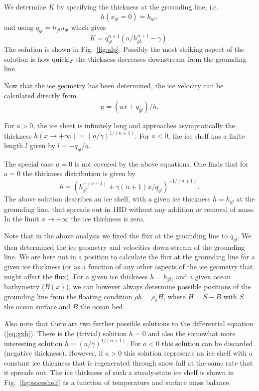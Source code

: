 \documentclass[10pt,a4paper]{book}
\begin{document}
We determine $K$ by specifying the
thickness at the grounding line, i.e.\
\[
h(x_{gl}=0)=h_{gl},
\]
and using $q_{gl}=h_{gl} u_{gl}$ which gives 
\[
K=q_{gl}^{n + 1}(a/h_{gl}^{n + 1}-\gamma).
\]
The solution is shown in Fig.~\ref{fig:alp}. Possibly the most
striking aspect of the solution is how quickly the thickness decreases
downstream from the grounding line.

Now that the ice geometry has been determined, the ice velocity can be
calculated directly from
\[
u=(a x+ q_{gl})/h.
\]


For $a>0$, the ice sheet is infinitely long and approaches
asymptotically the thickness $h(x\to +
\infty)=(a/\gamma)^{1/(n+1)}$. For $a<0$, the ice shelf has a finite
length $l$ given by $l=-q_{gl}/a$.

The special case $a=0$ is not covered by the above equations. One
finds that for $a=0$ the thickness distribution is given by
\begin{equation}
h=(h_{gl}^{-(n+1)}+\gamma (n+1) x/q_{gl})^{-1/(n+1)}.
\end{equation}
The above solution describes an ice shelf, with a given ice thickness
$h=h_{gl}$ at the grounding line, that spreads out in 1HD without any
addition or removal of mass. In the limit $x
\to +\infty$ the ice thickness is zero.



Note that in the above analysis we fixed the flux at the grounding
line to $q_{gl}$. We then determined the ice geometry and velocities
down-stream of the grounding line. We are here not in a position to
calculate the flux at the grounding line for a given ice thickness (or
as a function of any other aspects of the ice geometry that might
affect the flux). For a given ice thickness $h=h_{gl}$, and a given
ocean bathymetry ($B(x)$), we can however always determine possible
positions of the grounding line from the floating condition $\rho h =
\rho_o H$, where $H=S-B$ with $S$ the ocean surface and $B$ the ocean
bed.



Also note that there are two further possible solutions to the
differential equation (\ref{eq:gxh}). There is the (trivial) solution
$h=0$ and also the somewhat more interesting solution
$h=(a/\gamma)^{1/(n+1)}$.  For $a<0$ this solution can be discarded
(negative thickness). However, if $a>0$ this solution represents an
ice shelf with a constant ice thickness that is regenerated through
snow fall at the same rate that it spreads out. The ice thickness of
such a steady-state ice shelf is shown in Fig.~\ref{fig:ssiceshelf} as
a function of temperature and surface mass balance.
\end{document}
